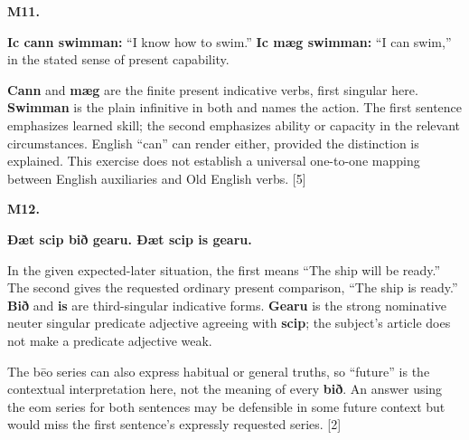 \par\begin{minipage}{\linewidth}\raggedright
\textbf{M11.}

\textbf{Ic cann swimman:} “I know how to swim.” \textbf{Ic mæg swimman:} “I can swim,” in the stated sense of present capability.

\textbf{Cann} and \textbf{mæg} are the finite present indicative verbs, first singular here. \textbf{Swimman} is the plain infinitive in both and names the action. The first sentence emphasizes learned skill; the second emphasizes ability or capacity in the relevant circumstances. English “can” can render either, provided the distinction is explained. This exercise does not establish a universal one-to-one mapping between English auxiliaries and Old English verbs. [5]

\end{minipage}\par\addvspace{4pt}

\par\begin{minipage}{\linewidth}\raggedright
\textbf{M12.}

\textbf{Ðæt scip bið gearu. Ðæt scip is gearu.}

In the given expected-later situation, the first means “The ship will be ready.” The second gives the requested ordinary present comparison, “The ship is ready.” \textbf{Bið} and \textbf{is} are third-singular indicative forms. \textbf{Gearu} is the strong nominative neuter singular predicate adjective agreeing with \textbf{scip}; the subject’s article does not make a predicate adjective weak.

The bēo series can also express habitual or general truths, so “future” is the contextual interpretation here, not the meaning of every \textbf{bið}. An answer using the eom series for both sentences may be defensible in some future context but would miss the first sentence’s expressly requested series. [2]

\end{minipage}\par\addvspace{4pt}

